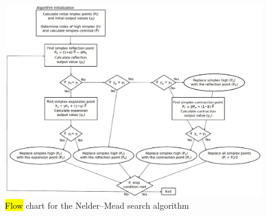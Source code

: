 \documentclass[metals,article,accept,pdftex,moreauthors]{Definitions/mdpi}
\begin{document}
\begin{figure}[H]
	\includegraphics[width=\textwidth]{nm_flow}
	\caption{\hl{Flow} %
 chart for the Nelder--Mead search algorithm}
	\label{fig:nm_flow}
\end{figure}
\end{document}
